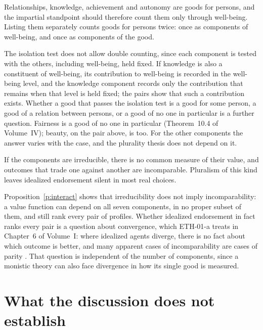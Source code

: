 \documentclass{situationist-preprint}
\begin{document}
\begin{objection}
Relationships, knowledge, achievement and autonomy are goods for persons, and the impartial standpoint should therefore count them only through well-being. Listing them separately counts goods for persons twice: once as components of well-being, and once as components of the good.
\end{objection}

\begin{reply}
The isolation test does not allow double counting, since each component is tested with the others, including well-being, held fixed. If knowledge is also a constituent of well-being, its contribution to well-being is recorded in the well-being level, and the knowledge component records only the contribution that remains when that level is held fixed; the pairs show that such a contribution exists. Whether a good that passes the isolation test is a good for some person, a good of a relation between persons, or a good of no one in particular is a further question. Fairness is a good of no one in particular (Theorem~10.4 of Volume~IV); beauty, on the pair above, is too. For the other components the answer varies with the case, and the plurality thesis does not depend on it.
\end{reply}

\begin{objection}[Incomparability]
If the components are irreducible, there is no common measure of their value, and outcomes that trade one against another are incomparable. Pluralism of this kind leaves idealized endorsement silent in most real choices.
\end{objection}

\begin{reply}
Proposition~\ref{p:interact} shows that irreducibility does not imply incomparability: a value function can depend on all seven components, in no proper subset of them, and still rank every pair of profiles. Whether idealized endorsement in fact ranks every pair is a question about convergence, which ETH-01-a treats in Chapter~6 of Volume~I: where idealized agents diverge, there is no fact about which outcome is better, and many apparent cases of incomparability are cases of parity \citep{Chang2002}. That question is independent of the number of components, since a monistic theory can also face divergence in how its single good is measured.
\end{reply}

\section{What the discussion does not establish}\label{s:not}
\end{document}
